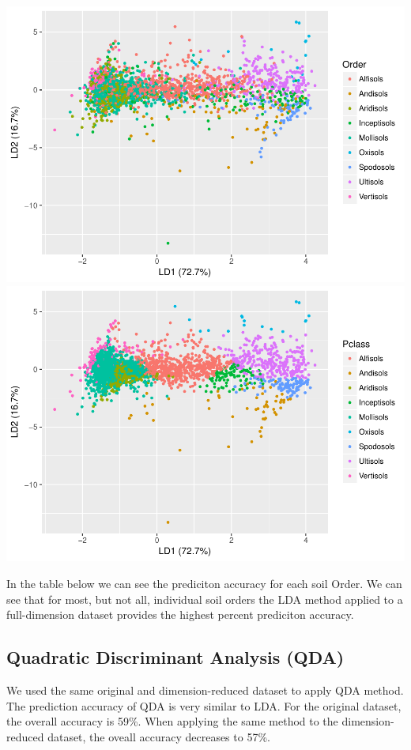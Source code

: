 \documentclass[]{article}
\begin{document}
\includegraphics{Project1_files/figure-latex/LDA with PCA - Fei-1.pdf}
\includegraphics{Project1_files/figure-latex/LDA with PCA - Fei-2.pdf}

In the table below we can see the prediciton accuracy for each soil
Order. We can see that for most, but not all, individual soil orders the
LDA method applied to a full-dimension dataset provides the highest
percent prediciton accuracy.

\subsection{Quadratic Discriminant Analysis
(QDA)}\label{quadratic-discriminant-analysis-qda}

We used the same original and dimension-reduced dataset to apply QDA
method. The prediction accuracy of QDA is very similar to LDA. For the
original dataset, the overall accuracy is 59\%. When applying the same
method to the dimension-reduced dataset, the oveall accuracy decreases
to 57\%.
\end{document}
